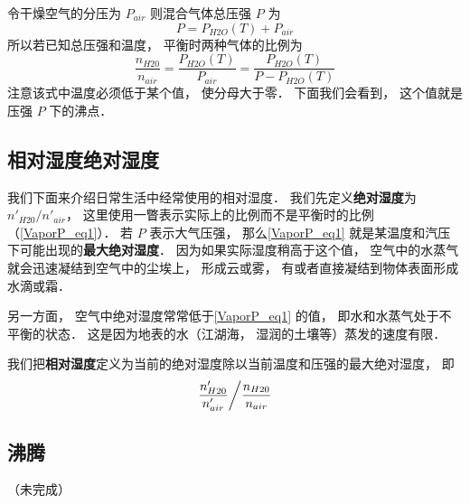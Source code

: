 令干燥空气的分压为 $P_{air}$ 则混合气体总压强 $P$ 为
\begin{equation}
P = P_{H2O}(T) + P_{air}
\end{equation}
所以若已知总压强和温度， 平衡时两种气体的比例为
\begin{equation}\label{VaporP_eq1}
\frac{n_{H20}}{n_{air}} = \frac{P_{H2O}(T)}{P_{air}} = \frac{P_{H2O}(T)}{P - P_{H2O}(T)}
\end{equation}
注意该式中温度必须低于某个值， 使分母大于零． 下面我们会看到， 这个值就是压强 $P$ 下的沸点．

\subsection{相对湿度绝对湿度}
我们下面来介绍日常生活中经常使用的相对湿度． 我们先定义\textbf{绝对湿度}为 $n'_{H20}/n'_{air}$， 这里使用一瞥表示实际上的比例而不是平衡时的比例（\autoref{VaporP_eq1}）． 若 $P$ 表示大气压强， 那么\autoref{VaporP_eq1} 就是某温度和汽压下可能出现的\textbf{最大绝对湿度}． 因为如果实际湿度稍高于这个值， 空气中的水蒸气就会迅速凝结到空气中的尘埃上， 形成云或雾， 有或者直接凝结到物体表面形成水滴或霜．

另一方面， 空气中绝对湿度常常低于\autoref{VaporP_eq1} 的值， 即水和水蒸气处于不平衡的状态． 这是因为地表的水（江湖海， 湿润的土壤等）蒸发的速度有限．

我们把\textbf{相对湿度}定义为当前的绝对湿度除以当前温度和压强的最大绝对湿度， 即
\begin{equation}
\left. \frac{n'_{H20}}{n'_{air}} \middle/ \frac{n_{H20}}{n_{air}} \right.
\end{equation}

\subsection{沸腾}

（未完成）
